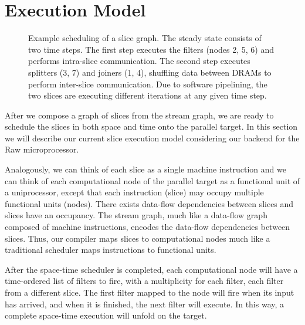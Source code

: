 
\section{Execution Model}
\begin{figure}[t]
\centering
{}
\caption{Example scheduling of a slice graph.  The steady state
consists of two time steps.  The first step executes the filters
(nodes 2, 5, 6) and performs intra-slice communication.  The second
step executes splitters (3, 7) and joiners (1, 4), shuffling data
between DRAMs to perform inter-slice communication.  Due to software
pipelining, the two slices are executing different iterations at any
given time step.  \protect\label{fig:slice}}
\end{figure}

After we compose a graph of slices from the stream graph, we are ready
to schedule the slices in both space and time onto the parallel
target.  In this section we will describe our current slice execution
model considering our backend for the Raw microprocessor.

Analogously, we can think of each slice as a single machine
instruction and we can think of each computational node of the
parallel target as a functional unit of a uniprocessor, except that
each instruction (slice) may occupy multiple functional units
(nodes). There exists data-flow dependencies between slices and slices
have an occupancy.  The stream graph, much like a data-flow graph
composed of machine instructions, encodes the data-flow dependencies
between slices. Thus, our compiler maps slices to computational nodes
much like a traditional scheduler maps instructions to functional
units.

After the space-time scheduler is completed, each computational node
will have a time-ordered list of filters to fire, with a multiplicity
for each filter, each filter from a different slice.  The first
filter mapped to the node will fire when its input has arrived, and
when it is finished, the next filter will execute.  In this way, a
complete space-time execution will unfold on the target.

